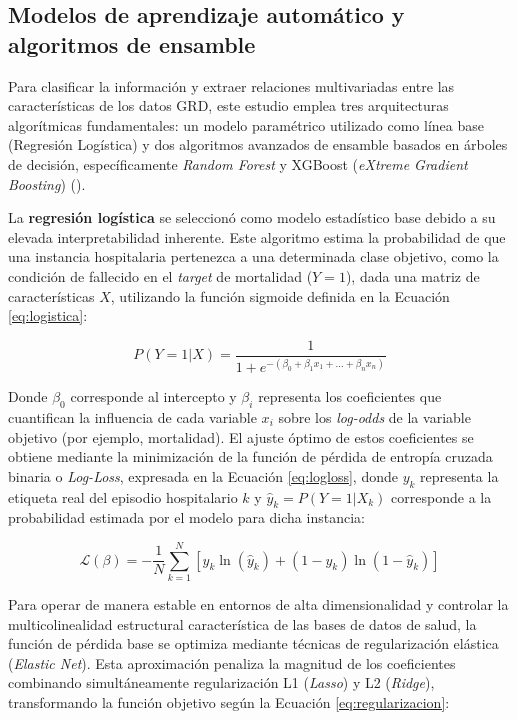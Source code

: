 \subsection{Modelos de aprendizaje automático y algoritmos de ensamble}

Para clasificar la información y extraer relaciones multivariadas entre las características de los datos GRD, este estudio emplea tres arquitecturas algorítmicas fundamentales: un modelo paramétrico utilizado como línea base (Regresión Logística) y dos algoritmos avanzados de ensamble basados en árboles de decisión, específicamente \textit{Random Forest} y XGBoost (\textit{eXtreme Gradient Boosting}) (\cite{hastie2009elements}).


La \textbf{regresión logística} se seleccionó como modelo estadístico base debido a su elevada interpretabilidad inherente. Este algoritmo estima la probabilidad de que una instancia hospitalaria pertenezca a una determinada clase objetivo, como la condición de fallecido en el \textit{target} de mortalidad ($Y=1$), dada una matriz de características $X$, utilizando la función sigmoide definida en la Ecuación \ref{eq:logistica}:

\begin{equation}
    P(Y=1|X) = \frac{1}{1 + e^{-(\beta_0 + \beta_1 x_1 + \dots + \beta_n x_n)}}
    \label{eq:logistica}
\end{equation}

Donde $\beta_0$ corresponde al intercepto y $\beta_i$ representa los coeficientes que cuantifican la influencia de cada variable $x_i$ sobre los \textit{log-odds} de la variable objetivo (por ejemplo, mortalidad). El ajuste óptimo de estos coeficientes se obtiene mediante la minimización de la función de pérdida de entropía cruzada binaria o \textit{Log-Loss}, expresada en la Ecuación \ref{eq:logloss}, donde $y_k$ representa la etiqueta real del episodio hospitalario $k$ y $\hat{y}_k = P(Y=1|X_k)$ corresponde a la probabilidad estimada por el modelo para dicha instancia:

\begin{equation}
    \mathcal{L}(\beta) = -\frac{1}{N} \sum_{k=1}^{N} \left[ y_k \ln(\hat{y}_k) + (1 - y_k) \ln(1 - \hat{y}_k) \right]
    \label{eq:logloss}
\end{equation}

Para operar de manera estable en entornos de alta dimensionalidad y controlar la multicolinealidad estructural característica de las bases de datos de salud, la función de pérdida base se optimiza mediante técnicas de regularización elástica (\textit{Elastic Net}). Esta aproximación penaliza la magnitud de los coeficientes combinando simultáneamente regularización L1 (\textit{Lasso}) y L2 (\textit{Ridge}), transformando la función objetivo según la Ecuación \ref{eq:regularizacion}:

